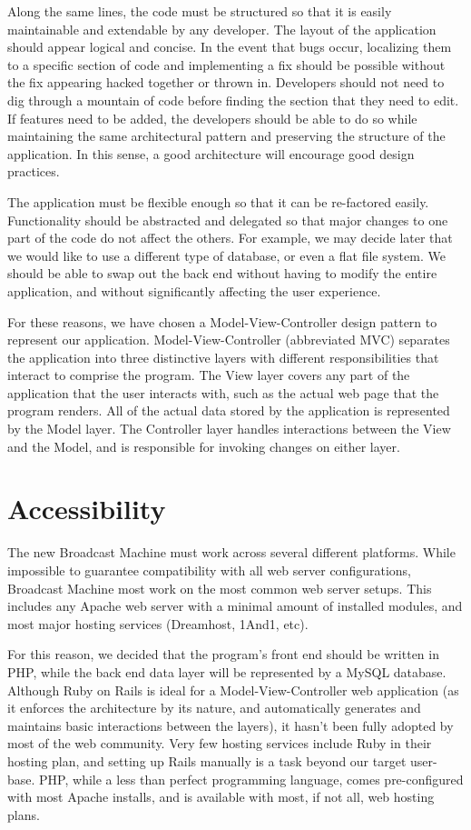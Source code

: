 \documentclass[a4paper,12pt]{report}
\begin{document}
Along the same lines, the code must be structured so that it is easily maintainable and extendable by any developer. The layout of the application should appear logical and concise. In the event that bugs occur, localizing them to a specific section of code and implementing a fix should be possible without the fix appearing hacked together or thrown in. Developers should not need to dig through a mountain of code before finding the section that they need to edit. If features need to be added, the developers should be able to do so while maintaining the same architectural pattern and preserving the structure of the application. In this sense, a good architecture will encourage good design practices.

The application must be flexible enough so that it can be re-factored easily. Functionality should be abstracted and delegated so that major changes to one part of the code do not affect the others. For example, we may decide later that we would like to use a different type of database, or even a flat file system. We should be able to swap out the back end without having to modify the entire application, and without significantly affecting the user experience.

For these reasons, we have chosen a Model-View-Controller design pattern to represent our application. Model-View-Controller (abbreviated MVC) separates the application into three distinctive layers with different responsibilities that interact to comprise the program. The View layer covers any part of the application that the user interacts with, such as the actual web page that the program renders. All of the actual data stored by the application is represented by the Model layer. The Controller layer handles interactions between the View and the Model, and is responsible for invoking changes on either layer.

\section{Accessibility}

The new Broadcast Machine must work across several different platforms. While impossible to guarantee compatibility with all web server configurations, Broadcast Machine most work on the most common web server setups. This includes any Apache web server with a minimal amount of installed modules, and most major hosting services (Dreamhost, 1And1, etc). 

For this reason, we decided that the program’s front end should be written in PHP, while the back end data layer will be represented by a MySQL database. Although Ruby on Rails is ideal for a Model-View-Controller web application (as it enforces the architecture by its nature, and automatically generates and maintains basic interactions between the layers), it hasn’t been fully adopted by most of the web community. Very few hosting services include Ruby in their hosting plan, and setting up Rails manually is a task beyond our target user-base. PHP, while a less than perfect programming language, comes pre-configured with most Apache installs, and is available with most, if not all, web hosting plans. 
\end{document}
